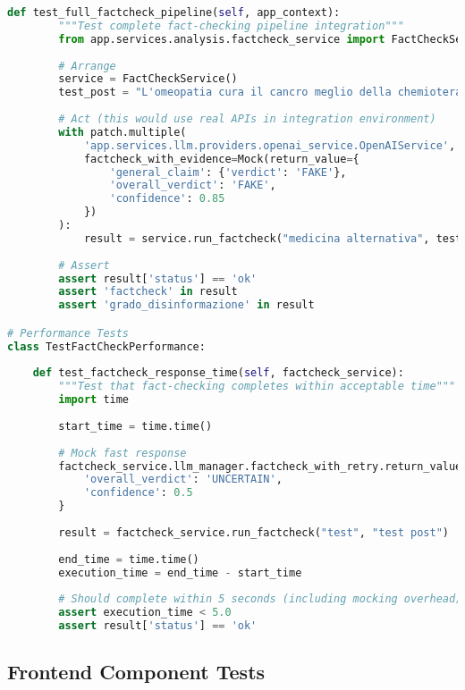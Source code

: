 \documentclass[12pt,a4paper]{report}
\begin{document}
\begin{lstlisting}[language=python, caption=Example Unit Tests - FactCheck Service]
    def test_full_factcheck_pipeline(self, app_context):
        """Test complete fact-checking pipeline integration"""
        from app.services.analysis.factcheck_service import FactCheckService
        
        # Arrange
        service = FactCheckService()
        test_post = "L'omeopatia cura il cancro meglio della chemioterapia"
        
        # Act (this would use real APIs in integration environment)
        with patch.multiple(
            'app.services.llm.providers.openai_service.OpenAIService',
            factcheck_with_evidence=Mock(return_value={
                'general_claim': {'verdict': 'FAKE'},
                'overall_verdict': 'FAKE',
                'confidence': 0.85
            })
        ):
            result = service.run_factcheck("medicina alternativa", test_post)
        
        # Assert
        assert result['status'] == 'ok'
        assert 'factcheck' in result
        assert 'grado_disinformazione' in result

# Performance Tests
class TestFactCheckPerformance:
    
    def test_factcheck_response_time(self, factcheck_service):
        """Test that fact-checking completes within acceptable time"""
        import time
        
        start_time = time.time()
        
        # Mock fast response
        factcheck_service.llm_manager.factcheck_with_retry.return_value = {
            'overall_verdict': 'UNCERTAIN',
            'confidence': 0.5
        }
        
        result = factcheck_service.run_factcheck("test", "test post")
        
        end_time = time.time()
        execution_time = end_time - start_time
        
        # Should complete within 5 seconds (including mocking overhead)
        assert execution_time < 5.0
        assert result['status'] == 'ok'
\end{lstlisting}

\subsection{Frontend Component Tests}
\end{document}
